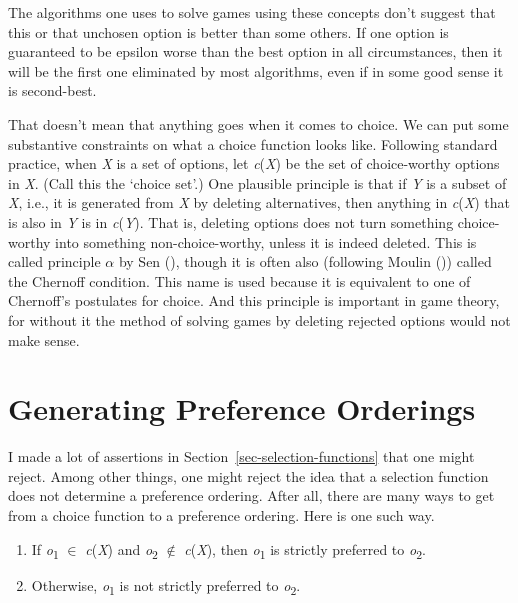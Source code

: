 \documentclass[
  12pt,
  letterpaper,
  DIV=11,
  numbers=noendperiod]{scrreprt}
\providecommand{\tightlist}{%
  \setlength{\itemsep}{0pt}\setlength{\parskip}{0pt}}\usepackage{longtable,booktabs,array}
\begin{document}
The algorithms one uses to solve games using these concepts don't
suggest that this or that unchosen option is better than some others. If
one option is guaranteed to be epsilon worse than the best option in all
circumstances, then it will be the first one eliminated by most
algorithms, even if in some good sense it is second-best.

That doesn't mean that anything goes when it comes to choice. We can put
some substantive constraints on what a choice function looks like.
Following standard practice, when \emph{X} is a set of options, let
\emph{c}(\emph{X}) be the set of choice-worthy options in \emph{X}.
(Call this the `choice set'.) One plausible principle is that if
\emph{Y} is a subset of \emph{X}, i.e., it is generated from \emph{X} by
deleting alternatives, then anything in \emph{c}(\emph{X}) that is also
in \emph{Y} is in \emph{c}(\emph{Y}). That is, deleting options does not
turn something choice-worthy into something non-choice-worthy, unless it
is indeed deleted. This is called principle \(\alpha\) by Sen
(), though it is often also (following
Moulin ()) called the Chernoff condition.
This name is used because it is equivalent to one of Chernoff's
postulates for choice. And this principle is important in game theory,
for without it the method of solving games by deleting rejected options
would not make sense.

\section{Generating Preference
Orderings}\label{sec-generating-orderings}

I made a lot of assertions in Section~\ref{sec-selection-functions} that
one might reject. Among other things, one might reject the idea that a
selection function does not determine a preference ordering. After all,
there are many ways to get from a choice function to a preference
ordering. Here is one such way.

\begin{enumerate}
\def\labelenumi{\arabic{enumi}.}
\tightlist
\item
  If \emph{o}\textsubscript{1} \(\in\) \emph{c}(\emph{X}) and
  \emph{o}\textsubscript{2} \(\notin\) \emph{c}(\emph{X}), then
  \emph{o}\textsubscript{1} is strictly preferred to
  \emph{o}\textsubscript{2}.
\item
  Otherwise, \emph{o}\textsubscript{1} is not strictly preferred to
  \emph{o}\textsubscript{2}.
\end{enumerate}
\end{document}
